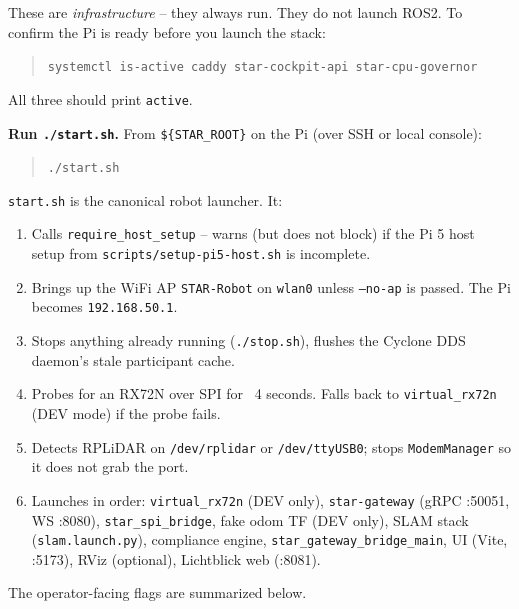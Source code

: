 These are \emph{infrastructure} -- they always run. They do not
launch ROS2. To confirm the Pi is ready before you launch the stack:

\begin{quote}\small
\texttt{systemctl is-active caddy star-cockpit-api star-cpu-governor}
\end{quote}

All three should print \texttt{active}.

\textbf{Run \texttt{./start.sh}.} From \texttt{\$\{STAR\_ROOT\}} on
the Pi (over SSH or local console):

\begin{quote}\small
\texttt{./start.sh}
\end{quote}

\texttt{start.sh} is the canonical robot launcher. It:

\begin{enumerate}
  \item Calls \texttt{require\_host\_setup} -- warns (but does not
        block) if the Pi 5 host setup from
        \texttt{scripts/setup-pi5-host.sh} is incomplete.
  \item Brings up the WiFi AP \texttt{STAR-Robot} on
        \texttt{wlan0} unless \texttt{--no-ap} is passed. The Pi
        becomes \texttt{192.168.50.1}.
  \item Stops anything already running (\texttt{./stop.sh}), flushes
        the Cyclone DDS daemon's stale participant cache.
  \item Probes for an RX72N over SPI for ~4 seconds. Falls back to
        \texttt{virtual\_rx72n} (DEV mode) if the probe fails.
  \item Detects RPLiDAR on \texttt{/dev/rplidar} or
        \texttt{/dev/ttyUSB0}; stops \texttt{ModemManager} so it does
        not grab the port.
  \item Launches in order: \texttt{virtual\_rx72n} (DEV only),
        \texttt{star-gateway} (gRPC :50051, WS :8080),
        \texttt{star\_spi\_bridge}, fake odom TF (DEV only), SLAM
        stack (\texttt{slam.launch.py}), compliance engine,
        \texttt{star\_gateway\_bridge\_main}, UI (Vite, :5173), RViz
        (optional), Lichtblick web (:8081).
\end{enumerate}

The operator-facing flags are summarized below.

